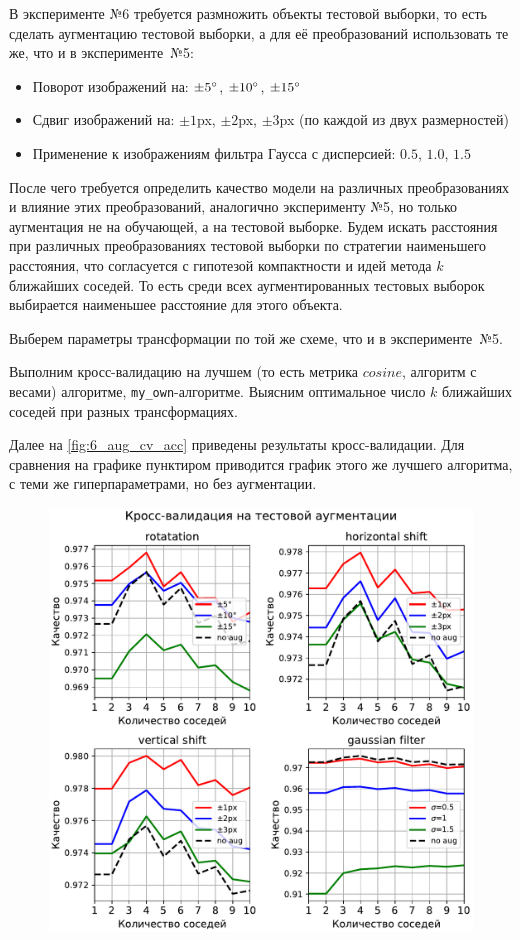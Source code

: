 \documentclass[12pt]{article}
\begin{document}
В эксперименте №6 требуется размножить объекты тестовой выборки, то есть сделать аугментацию тестовой выборки, а для её преобразований использовать те же, что и в эксперименте~№5:
\begin{itemize}
    \item Поворот изображений на: $\pm5\degree$, $\pm10\degree$, $\pm15\degree$
    \item Сдвиг изображений на: $\pm1$px, $\pm2$px, $\pm3$px (по каждой из двух размерностей)
    \item Применение к изображениям фильтра Гаусса с дисперсией: $0.5$, $1.0$, $1.5$
\end{itemize}

После чего требуется определить качество модели на различных преобразованиях и влияние этих преобразований, аналогично эксперименту №5, но только аугментация не на обучающей, а на тестовой выборке. Будем искать расстояния при различных преобразованиях тестовой выборки по стратегии наименьшего расстояния, что согласуется с гипотезой компактности \cite{compact} и идей метода $k$ ближайших соседей. То есть среди всех аугментированных тестовых выборок выбирается наименьшее расстояние для этого объекта.

Выберем параметры трансформации по той же схеме, что и в эксперименте~№5.

Выполним кросс-валидацию на лучшем (то есть метрика $cosine$, алгоритм с весами) алгоритме, \verb|my_own|-алгоритме. Выясним оптимальное число $k$ ближайших соседей при разных трансформациях.

Далее на \autoref{fig:6_aug_cv_acc} приведены результаты кросс-валидации. Для сравнения на графике пунктиром приводится график этого же лучшего алгоритма, с теми же гиперпараметрами, но без аугментации.

\begin{figure}[!h]
    \includegraphics[width=\textwidth]{6_aug_cv_acc}
    \caption{}
    \label{fig:6_aug_cv_acc}
\end{figure}
\end{document}
